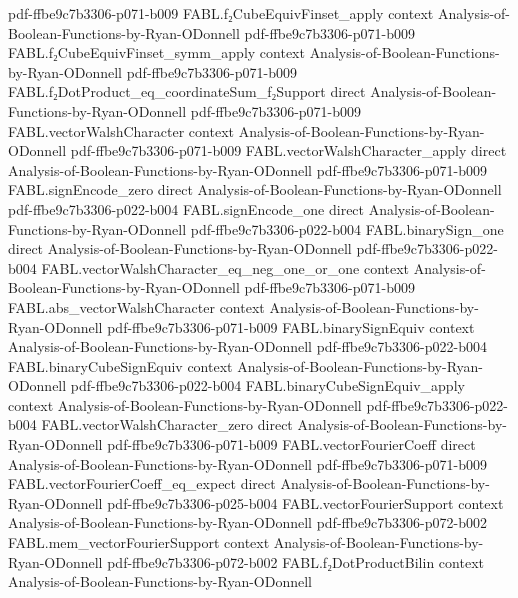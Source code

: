 \begin{theorem}
  {pdf-ffbe9c7b3306-p071-b009}
\proofstep
  {FABL.f₂CubeEquivFinset_apply}
  {context}
  {Analysis-of-Boolean-Functions-by-Ryan-ODonnell}
  {pdf-ffbe9c7b3306-p071-b009}
\proofstep
  {FABL.f₂CubeEquivFinset_symm_apply}
  {context}
  {Analysis-of-Boolean-Functions-by-Ryan-ODonnell}
  {pdf-ffbe9c7b3306-p071-b009}
\proofstep
  {FABL.f₂DotProduct_eq_coordinateSum_f₂Support}
  {direct}
  {Analysis-of-Boolean-Functions-by-Ryan-ODonnell}
  {pdf-ffbe9c7b3306-p071-b009}
\proofstep
  {FABL.vectorWalshCharacter}
  {context}
  {Analysis-of-Boolean-Functions-by-Ryan-ODonnell}
  {pdf-ffbe9c7b3306-p071-b009}
\proofstep
  {FABL.vectorWalshCharacter_apply}
  {direct}
  {Analysis-of-Boolean-Functions-by-Ryan-ODonnell}
  {pdf-ffbe9c7b3306-p071-b009}
\proofstep
  {FABL.signEncode_zero}
  {direct}
  {Analysis-of-Boolean-Functions-by-Ryan-ODonnell}
  {pdf-ffbe9c7b3306-p022-b004}
\proofstep
  {FABL.signEncode_one}
  {direct}
  {Analysis-of-Boolean-Functions-by-Ryan-ODonnell}
  {pdf-ffbe9c7b3306-p022-b004}
\proofstep
  {FABL.binarySign_one}
  {direct}
  {Analysis-of-Boolean-Functions-by-Ryan-ODonnell}
  {pdf-ffbe9c7b3306-p022-b004}
\proofstep
  {FABL.vectorWalshCharacter_eq_neg_one_or_one}
  {context}
  {Analysis-of-Boolean-Functions-by-Ryan-ODonnell}
  {pdf-ffbe9c7b3306-p071-b009}
\proofstep
  {FABL.abs_vectorWalshCharacter}
  {context}
  {Analysis-of-Boolean-Functions-by-Ryan-ODonnell}
  {pdf-ffbe9c7b3306-p071-b009}
\proofstep
  {FABL.binarySignEquiv}
  {context}
  {Analysis-of-Boolean-Functions-by-Ryan-ODonnell}
  {pdf-ffbe9c7b3306-p022-b004}
\proofstep
  {FABL.binaryCubeSignEquiv}
  {context}
  {Analysis-of-Boolean-Functions-by-Ryan-ODonnell}
  {pdf-ffbe9c7b3306-p022-b004}
\proofstep
  {FABL.binaryCubeSignEquiv_apply}
  {context}
  {Analysis-of-Boolean-Functions-by-Ryan-ODonnell}
  {pdf-ffbe9c7b3306-p022-b004}
\proofstep
  {FABL.vectorWalshCharacter_zero}
  {direct}
  {Analysis-of-Boolean-Functions-by-Ryan-ODonnell}
  {pdf-ffbe9c7b3306-p071-b009}
\proofstep
  {FABL.vectorFourierCoeff}
  {direct}
  {Analysis-of-Boolean-Functions-by-Ryan-ODonnell}
  {pdf-ffbe9c7b3306-p071-b009}
\proofstep
  {FABL.vectorFourierCoeff_eq_expect}
  {direct}
  {Analysis-of-Boolean-Functions-by-Ryan-ODonnell}
  {pdf-ffbe9c7b3306-p025-b004}
\proofstep
  {FABL.vectorFourierSupport}
  {context}
  {Analysis-of-Boolean-Functions-by-Ryan-ODonnell}
  {pdf-ffbe9c7b3306-p072-b002}
\proofstep
  {FABL.mem_vectorFourierSupport}
  {context}
  {Analysis-of-Boolean-Functions-by-Ryan-ODonnell}
  {pdf-ffbe9c7b3306-p072-b002}
\proofstep
  {FABL.f₂DotProductBilin}
  {context}
  {Analysis-of-Boolean-Functions-by-Ryan-ODonnell}

\end{theorem}
